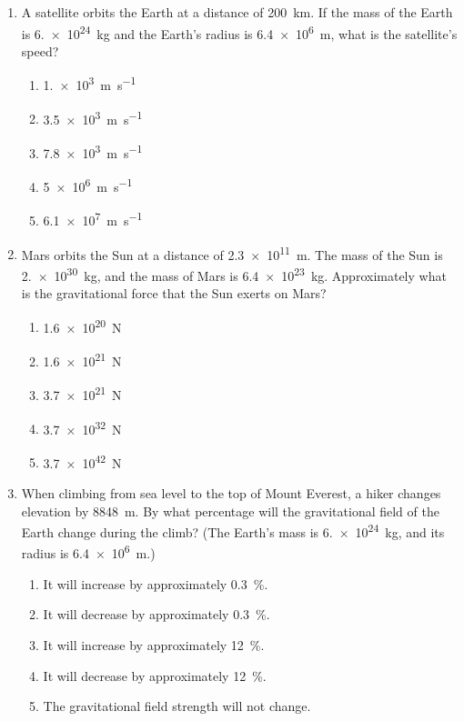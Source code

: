 \documentclass{../../oss-apphys}
\begin{document}
\begin{multicols}{2}
\begin{enumerate}[leftmargin=18pt]
  \item A satellite orbits the Earth at a distance of \SI{200}{\km}. If the mass
    of the Earth is \SI{6.e24}{\kilo\gram} and the Earth's radius is
    \SI{6.4e6}{\metre}, what is the satellite's speed?
    \begin{enumerate}[noitemsep,topsep=0pt,leftmargin=18pt,label=(\Alph*)]
    \item\SI{1.e3}{\metre\per\second}
    \item\SI{3.5e3}{\metre\per\second}
    \item\SI{7.8e3}{\metre\per\second}
    \item\SI{5e6}{\metre\per\second}
    \item\SI{6.1e7}{\metre\per\second}
    \end{enumerate}

    \columnbreak

  \item Mars orbits the Sun at a distance of \SI{2.3e11}{\metre}. The mass of
    the Sun is \SI{2.e30}{\kilo\gram}, and the mass of Mars is
    \SI{6.4e23}{\kilo\gram}. Approximately what is the gravitational force that
    the Sun exerts on Mars?
    \begin{enumerate}[noitemsep,topsep=0pt,leftmargin=18pt,label=(\Alph*)]
    \item\SI{1.6e20}{\newton}
    \item\SI{1.6e21}{\newton}
    \item\SI{3.7e21}{\newton}
    \item\SI{3.7e32}{\newton}
    \item\SI{3.7e42}{\newton}
    \end{enumerate}

  \item When climbing from sea level to the top of Mount Everest, a hiker
    changes elevation by \SI{8848}{\metre}. By what percentage will the
    gravitational field of the Earth change during the climb? (The Earth's
    mass is \SI{6.e24}{\kilo\gram}, and its radius is \SI{6.4e6}{\metre}.)
    \begin{enumerate}[noitemsep,topsep=0pt,leftmargin=18pt,label=(\Alph*)]
    \item It will increase by approximately \SI{0.3}{\percent}.
    \item It will decrease by approximately \SI{0.3}{\percent}.
    \item It will increase by approximately \SI{12}{\percent}.
    \item It will decrease by approximately \SI{12}{\percent}.
    \item The gravitational field strength will not change.
    \end{enumerate}


\end{enumerate}
\end{multicols}
\end{document}
